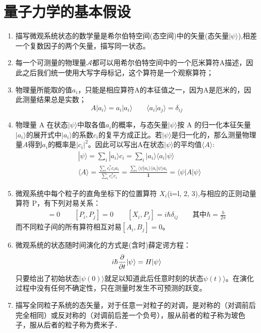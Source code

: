     \section{量子力学的基本假设}
\begin{enumerate}
    \item 
         描写微观系统状态的数学量是希尔伯特空间(态空间)中的矢量(态矢量$|\psi\rangle$),相差一个复数因子的两个矢量，描写同一状态。
         \item 
         每一个可测量的物理量$\mathcal{A}$都可以用希尔伯特空间中的一个厄米算符A描述，因此之后我们统一使用大写字母标记，这个算符是一个观察算符；
         \item 
         物理量所能取的值$a_i$，只能是相应算符A的本征值之一，因为A是厄米的，因此测量结果总是实数；
        \begin{equation}
            A|a_i\rangle=a_i|a_i\rangle\qquad\langle a_i|a_j\rangle=\delta_{ij}
        \end{equation}
        \item 
         物理量 A 在状态$|\psi\rangle$中取各值$a_i$的概率，与态矢量$|\psi\rangle$按 A 的归一化本征矢量{$|a_i\rangle$}的展开式中$|a_i\rangle$的系数$c_i$的复平方成正比。若$|\psi\rangle$是归一化的，那么测量物理量$A$得到$a_i$的概率是$|c_i|^2$。因此可以写出A在状态$|\psi\rangle$的平均值$\langle A\rangle$:
        \begin{align}
            &|\psi\rangle=\sum_{i}|a_i\rangle c_i=\sum_{i}|a_i\rangle\langle a_i|\psi\rangle\\
            &\langle A\rangle=\frac{\sum_{i}c_i^{*}c_ia_i}{\sum_{i}c_i^{*}c_i}=\frac{\sum_i\langle \psi|a_i\rangle\langle a_i|\psi\rangle a_i}{\mathbf{1}}=\langle\psi|A|\psi\rangle
        \end{align}
        \item 
            微观系统中每个粒子的直角坐标下的位置算符 $X_i$(i=l, 2, 3),与相应的正则动量算符 P，有下列对易关系：
        \begin{gather}
            [X_i,X_j]=0 \qquad [P_i,P_j]=0 \qquad [X_i,P_j]=i\hbar\delta_{ij}\qquad\text{其中}\hbar=\frac{h}{2\pi}
        \end{gather}
        而不同粒子间的所有算符相互对易$[A_i,B_j]=0$。
        \item 
        微观系统的状态随时间演化的方式是(含时)薛定谔方程：
        \begin{equation}
            i\hbar\pdv{}{t}|\psi\rangle=H|\psi\rangle
        \end{equation}
        只要给出了初始状态$|\psi(0)\rangle$就足以知道此后任意时刻的状态$\psi(t)\rangle$。在演化过程中没有任何不确定性，只在测量时发生不可预测的跃变。
        \item 描写全同粒子系统的态矢量，对于任意一对粒子的对调，是对称的（对调前后完全相同）或反对称的（对调前后差一个负号），服从前者的粒子称为玻色子，服从后者的粒子称为费米子．
    \end{enumerate}
